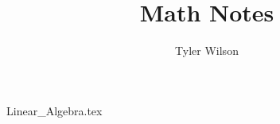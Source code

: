 \documentclass[11pt, fleqn]{article}
\title{Math Notes}
\author{Tyler Wilson}
\date{}
\begin{document}
\allowdisplaybreaks

\maketitle
\tableofcontents

{Linear_Algebra.tex}
\end{document}
